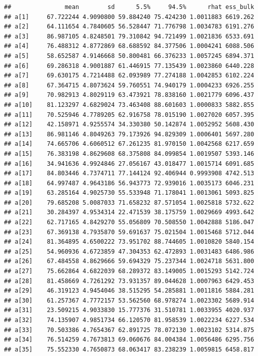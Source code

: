 \documentclass[
]{book}
\begin{document}
\begin{verbatim}
##               mean        sd      5.5%     94.5%      rhat ess_bulk
## a[1]     67.722244 4.9090800 59.884240 75.424230 1.0011883 6619.262
## a[2]     64.111654 4.7840605 56.528447 71.776798 1.0034783 6191.276
## a[3]     86.987105 4.8248501 79.310842 94.721499 1.0021836 6533.691
## a[4]     76.488312 4.8772869 68.688592 84.377506 1.0004241 6088.506
## a[5]     58.652587 4.9146668 50.800481 66.376233 1.0057245 6894.371
## a[6]     69.286318 4.9001887 61.446915 77.135439 1.0023860 6440.228
## a[7]     69.630175 4.7214488 62.093989 77.274188 1.0042853 6102.224
## a[8]     67.364715 4.8073624 59.760551 74.940179 1.0004233 6926.255
## a[9]     70.982913 4.8029119 63.473921 78.838160 1.0021779 6096.437
## a[10]    81.123297 4.6829024 73.463408 88.601603 1.0000833 5882.855
## a[11]    70.525946 4.7789205 62.916758 78.015190 1.0027020 6057.395
## a[12]    42.158971 4.9255574 34.330380 50.142874 1.0052952 5608.430
## a[13]    86.981146 4.8049263 79.173926 94.829309 1.0006401 5697.280
## a[14]    74.665706 4.6060512 67.261235 81.970150 1.0042568 6217.659
## a[15]    76.383198 4.8629608 68.375808 84.099854 1.0019507 5393.146
## a[16]    34.941636 4.9924846 27.056167 43.018477 1.0015714 6091.685
## a[17]    84.803446 4.7374711 77.144124 92.406944 0.9993908 4742.513
## a[18]    64.997487 4.9643186 56.943773 72.939016 1.0035173 6046.231
## a[19]    63.285164 4.9025730 55.533948 71.178041 1.0013061 5093.825
## a[20]    79.685208 5.0087033 71.658232 87.571054 1.0025818 5732.622
## a[21]    30.284397 4.9534314 22.471539 38.175759 1.0029669 4993.642
## a[22]    62.717165 4.8429270 55.056809 70.508550 1.0042888 5186.047
## a[23]    67.369138 4.7935870 59.691637 75.021504 1.0015468 5712.044
## a[24]    81.364895 4.6500222 73.951702 88.744605 1.0010820 5840.154
## a[25]    54.960936 4.6723859 47.304353 62.472893 1.0031483 6486.986
## a[26]    67.484558 4.8629666 59.694329 75.237344 1.0024718 5631.800
## a[27]    75.662864 4.6822039 68.289372 83.149005 1.0015293 5142.724
## a[28]    81.458669 4.7261292 73.931357 89.044628 1.0007963 6429.453
## a[29]    46.319123 4.9454046 38.515295 54.285881 1.0011816 5884.281
## a[30]    61.257367 4.7772157 53.562560 68.978274 1.0023302 5689.914
## a[31]    23.509215 4.9033830 15.777376 31.510781 1.0033955 4020.937
## a[32]    74.135907 4.9851734 66.120570 81.958539 1.0022234 6227.534
## a[33]    70.503386 4.7654367 62.891725 78.072130 1.0023102 5314.875
## a[34]    76.514259 4.7673813 69.060676 84.004384 1.0056486 6295.756
## a[35]    75.552330 4.7650873 68.063417 83.238239 1.0059815 6458.817

\end{verbatim}
\end{document}
